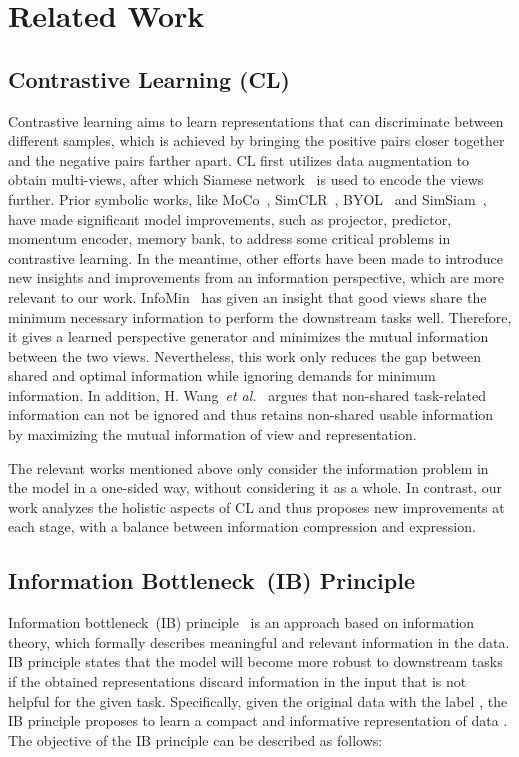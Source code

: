 \documentclass[10pt,twocolumn,letterpaper]{article}
\begin{document}
\section{Related Work}
\label{sec:rela}
\subsection{Contrastive Learning (CL)}
Contrastive learning aims to learn representations that can discriminate between different samples, which is achieved by bringing the positive pairs closer together and the negative pairs farther apart. CL first utilizes data augmentation to obtain multi-views, after which Siamese network~\cite{chen2021exploring,grill2020bootstrap} is used to encode the views further.
Prior symbolic works, like MoCo~\cite{he2020momentum,chen2020improved,chen2021empirical}, SimCLR~\cite{chen2020simple}, BYOL~\cite{grill2020bootstrap} and SimSiam~\cite{chen2021exploring}, have made significant model improvements, such as projector, predictor, momentum encoder, memory bank, to address some critical problems in contrastive learning. In the meantime, other efforts have been made to introduce new insights and improvements from an information perspective, which are more relevant to our work. InfoMin~\cite{tian2020makes} has given an insight that good views share the minimum necessary information to perform the downstream tasks well. Therefore, it gives a learned perspective generator and minimizes the mutual information between the two views. Nevertheless, this work only reduces the gap between shared and optimal information while ignoring demands for minimum information.
In addition, H. Wang~\textit{et al.}~\cite{wang2022rethinking} argues that non-shared task-related information can not be ignored and thus retains non-shared usable information by maximizing the mutual information of view and representation.

The relevant works mentioned above only consider the information problem in the model in a one-sided way, without considering it as a whole. In contrast, our work analyzes the holistic aspects of CL and thus proposes new improvements at each stage, with a balance between information compression and expression.

\subsection{Information Bottleneck~(IB) Principle}
Information bottleneck~(IB) principle~\cite{tishby99information,shwartz2017opening,alemi2017vib,voloshynovskiy2020variational} is an approach based on information theory, which formally describes meaningful and relevant information in the data. IB principle states that the model will become more robust to downstream tasks if the obtained representations discard information in the input that is not helpful for the given task. Specifically, given the original data  with the label , the IB principle proposes to learn a compact and informative representation  of data . The objective of the IB principle can be described as follows:
\end{document}
